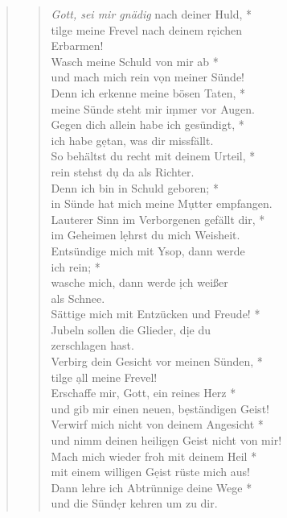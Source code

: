 \begin{quote}
\begin{verse}
 \textit{Gott, sei mir gnädig} nach deiner Huld, *\\
tilge meine Frevel nach deinem r\d eichen\\ Erbarmen! \\
\vin Wasch meine Schuld von mir ab *\\
\vin und mach mich rein v\d on meiner Sünde!\\
Denn ich erkenne meine bösen Taten, *\\
meine Sünde steht mir i\d mmer vor Augen. \\
\vin Gegen dich allein habe ich gesündigt, *\\
\vin ich habe g\d etan, was dir missfällt. \\
So behältst du recht mit deinem Urteil, *\\ rein stehst d\d u da als Richter. \\
\vin Denn ich bin in Schuld geboren; *\\
\vin in Sünde hat mich meine M\d utter empfangen. \\
Lauterer Sinn im Verborgenen gefällt dir, *\\
im Geheimen l\d ehrst du mich Weisheit.\\
\vin Entsündige mich mit Ysop, dann werde \\ \vin ich rein; *\\
\vin wasche mich, dann werde \d ich weißer\\ \vin als Schnee. \\
Sättige mich mit Entzücken und Freude! *\\
Jubeln sollen die Glieder, d\d ie du \\zerschlagen hast.\\
\vin Verbirg dein Gesicht vor meinen Sünden, *\\
\vin tilge \d all meine Frevel!\\
Erschaffe mir, Gott, ein reines Herz *\\
und gib mir einen neuen, b\d eständigen Geist! \\
\vin Verwirf mich nicht von deinem Angesicht *\\
\vin und nimm deinen heilig\d en Geist nicht von mir! \\
Mach mich wieder froh mit deinem Heil *\\
mit einem willigen G\d eist rüste mich aus!\\
\vin Dann lehre ich Abtrünnige deine Wege *\\
\vin und die Sünd\d er kehren um zu dir.\\

\end{verse}
\end{quote}
